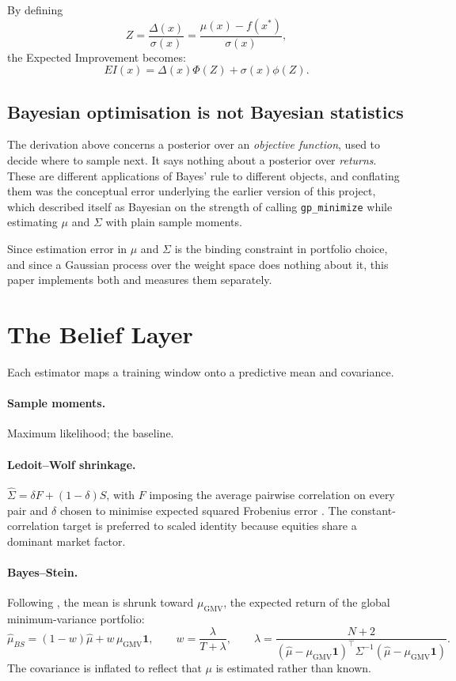 \documentclass[a4paper,12pt]{article}
\begin{document}
By defining
\[
Z = \frac{\Delta(x)}{\sigma(x)} = \frac{\mu(x) - f(x^*)}{\sigma(x)},
\]
the Expected Improvement becomes:
\[
EI(x) = \Delta(x)\Phi(Z) + \sigma(x)\phi(Z).
\]

\subsection{Bayesian optimisation is not Bayesian statistics}
\label{sec:two-bayes}
The derivation above concerns a posterior over an \emph{objective function}, used
to decide where to sample next. It says nothing about a posterior over
\emph{returns}. These are different applications of Bayes' rule to different
objects, and conflating them was the conceptual error underlying the earlier
version of this project, which described itself as Bayesian on the strength of
calling \texttt{gp\_minimize} while estimating $\mu$ and $\Sigma$ with plain
sample moments.

Since estimation error in $\mu$ and $\Sigma$ is the binding constraint in
portfolio choice, and since a Gaussian process over the weight space does nothing
about it, this paper implements both and measures them separately.

\section{The Belief Layer}
Each estimator maps a training window onto a predictive mean and covariance.

\paragraph{Sample moments.} Maximum likelihood; the baseline.

\paragraph{Ledoit--Wolf shrinkage.} $\hat\Sigma = \delta F + (1-\delta)S$, with $F$
imposing the average pairwise correlation on every pair and $\delta$ chosen to
minimise expected squared Frobenius error \citep{ledoit2004}. The
constant-correlation target is preferred to scaled identity because equities share
a dominant market factor.

\paragraph{Bayes--Stein.} Following \citet{jorion1986}, the mean is shrunk toward
$\mu_{\text{GMV}}$, the expected return of the global minimum-variance portfolio:
\[
\hat\mu_{BS} = (1-w)\hat\mu + w\,\mu_{\text{GMV}}\mathbf{1},
\qquad w = \frac{\lambda}{T+\lambda},
\qquad \lambda = \frac{N+2}{(\hat\mu - \mu_{\text{GMV}}\mathbf{1})^\top \Sigma^{-1} (\hat\mu - \mu_{\text{GMV}}\mathbf{1})}.
\]
The covariance is inflated to reflect that $\mu$ is estimated rather than known.
\end{document}
